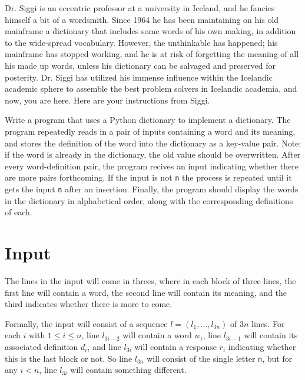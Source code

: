 
Dr. Siggi is an eccentric professor at a university in Iceland,
and he fancies himself a bit of a wordsmith.
Since 1964 he has been maintaining on his old mainframe
a dictionary that includes some words of his own making,
in addition to the wide-spread vocabulary.
However, the unthinkable has happened; his mainframe has stopped working,
and he is at risk of forgetting the meaning of all his made up words,
unless his dictionary can be salvaged and preserved for posterity.
Dr. Siggi has utilized his immense influence within the Icelandic academic sphere
to assemble the best problem solvers in Icelandic academia, and now, you are here.
Here are your instructions from Siggi.

Write a program that uses a Python dictionary to implement a dictionary.
The program repeatedly reads in a pair of inputs containing a word and its meaning,
and stores the definition of the word into the dictionary as a key-value pair.
Note: if the word is already in the dictionary, the old value should be overwritten.
After every word-definition pair, the program recives an input indicating whether there are more pairs forthcoming.
If the input is not \texttt{n} the process is repeated until it gets the input \texttt{n} after an insertion.
Finally, the program should display the words in the dictionary in alphabetical order,
along with the corresponding definitions of each.


\section*{Input}

The lines in the input will come in threes,
where in each block of three lines,
the first line will contain a word,
the second line will contain its meaning,
and the third indicates whether there is more to come.

Formally, the input will consist of a sequence $l = (l_1, \dots, l_{3n})$ of $3n$ lines.
For each $i$ with $1 \le i \le n$,
line $l_{3i - 2}$ will contain a word $w_i$,
line $l_{3i - 1}$ will contain its associated definition $d_i$,
and line $l_{3i}$ will contain a response $r_i$
indicating whether this is the last block or not.
So line $l_{3n}$ will consist of the single letter \texttt{n},
but for any $i < n$, line $l_{3i}$ will contain something different.

